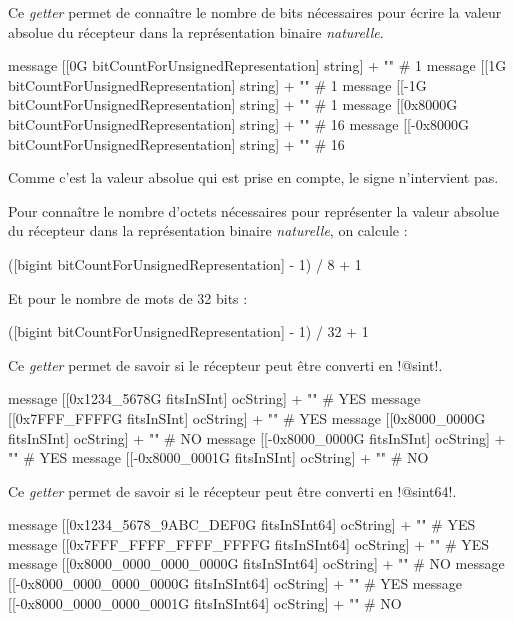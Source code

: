 
Ce \emph{getter} permet de connaître le nombre de bits nécessaires pour écrire la valeur absolue du récepteur dans la représentation binaire \emph{naturelle}. 

\begin{galgas}
message [[0G bitCountForUnsignedRepresentation] string] + "\n" # 1
message [[1G bitCountForUnsignedRepresentation] string] + "\n" # 1
message [[-1G bitCountForUnsignedRepresentation] string] + "\n" # 1
message [[0x8000G bitCountForUnsignedRepresentation] string] + "\n" # 16
message [[-0x8000G bitCountForUnsignedRepresentation] string] + "\n" # 16
\end{galgas}

Comme c'est la valeur absolue qui est prise en compte, le signe n'intervient pas.

Pour connaître le nombre d'octets nécessaires pour représenter la valeur absolue du récepteur dans la représentation binaire \emph{naturelle}, on calcule :
\begin{galgas}
([bigint bitCountForUnsignedRepresentation] - 1) / 8 + 1 
\end{galgas}

Et pour le nombre de mots de 32 bits :
\begin{galgas}
([bigint bitCountForUnsignedRepresentation] - 1) / 32 + 1 
\end{galgas}


Ce \emph{getter} permet de savoir si le récepteur peut être converti en \ggs!@sint!.

\begin{galgas}
message [[0x1234_5678G fitsInSInt] ocString] + "\n" # YES
message [[0x7FFF_FFFFG fitsInSInt] ocString] + "\n" # YES
message [[0x8000_0000G fitsInSInt] ocString] + "\n" # NO
message [[-0x8000_0000G fitsInSInt] ocString] + "\n" # YES
message [[-0x8000_0001G fitsInSInt] ocString] + "\n" # NO
\end{galgas}





Ce \emph{getter} permet de savoir si le récepteur peut être converti en \ggs!@sint64!.

\begin{galgas}
message [[0x1234_5678_9ABC_DEF0G fitsInSInt64] ocString] + "\n" # YES
message [[0x7FFF_FFFF_FFFF_FFFFG fitsInSInt64] ocString] + "\n" # YES
message [[0x8000_0000_0000_0000G fitsInSInt64] ocString] + "\n" # NO
message [[-0x8000_0000_0000_0000G fitsInSInt64] ocString] + "\n" # YES
message [[-0x8000_0000_0000_0001G fitsInSInt64] ocString] + "\n" # NO
\end{galgas}




